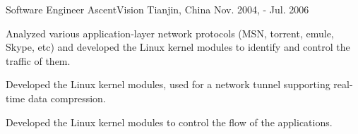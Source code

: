 \begin{cventries}
  \cventry
    {Software Engineer} %
    {AscentVision} %
    {Tianjin, China} %
    {Nov. 2004, - Jul. 2006} %
    {
      \begin{cvitems} %
        \item {Analyzed various application‐layer network protocols (MSN, torrent, emule, Skype, etc) and developed the Linux kernel modules to identify and control the traffic of them.}
        \item {Developed the Linux kernel modules, used for a network tunnel supporting real-time data compression.}
        \item {Developed the Linux kernel modules to control the flow of the applications.}
      \end{cvitems}
    }

\end{cventries}
